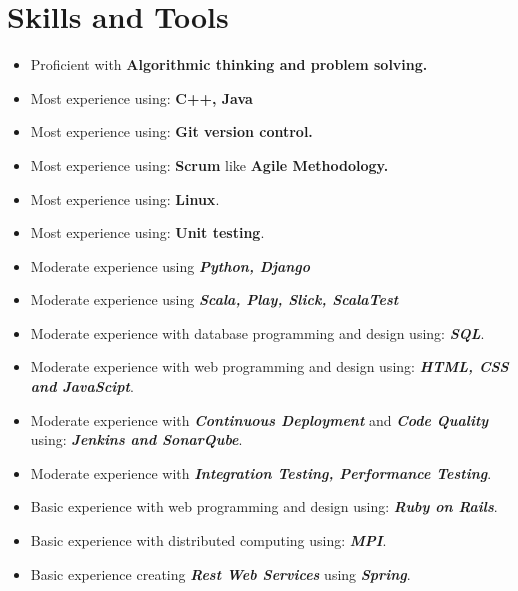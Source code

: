 \documentclass[a4paper,10pt]{article} %
\begin{document}

\section{Skills and Tools}
\begin{itemize}
 \item Proficient with \textbf{Algorithmic thinking and problem solving.}
 \item Most experience using: \textbf{C++, Java}
 \item Most experience using: \textbf{Git version control.}
 \item Most experience using: \textbf{Scrum} like \textbf{Agile Methodology.}
 \item Most experience using: \textbf{Linux}.
 \item Most experience using: \textbf{Unit testing}.
 \item Moderate experience using {\sl \textbf{Python, Django}} 
 \item Moderate experience using {\sl \textbf{Scala, Play, Slick, ScalaTest}}
 \item Moderate experience with database programming and design using: {\sl \textbf{SQL}}.
 \item Moderate experience with web programming and design using: {\sl \textbf{HTML, CSS and JavaScipt}}.
 \item Moderate experience with {\sl \textbf{Continuous Deployment}} and {\sl \textbf{Code Quality}} using: {\sl \textbf{Jenkins and SonarQube}}.
 \item Moderate experience with {\sl \textbf{Integration Testing, Performance Testing}}.
 \item Basic experience with web programming and design using: {\sl \textbf{Ruby on Rails}}.
 \item Basic experience with distributed computing using: {\sl \textbf{MPI}}.
 \item Basic experience creating {\sl \textbf{Rest Web Services}} using {\sl \textbf{Spring}}.
\end{itemize}

\end{document}

